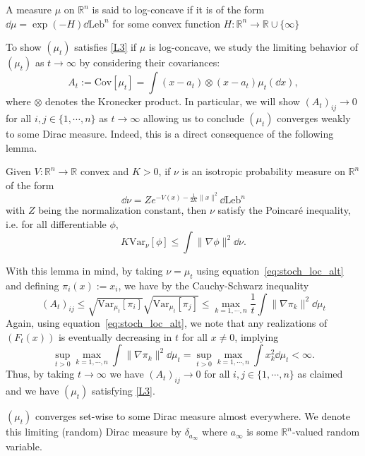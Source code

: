 \begin{definition}
  A measure \(\mu\) on \(\mathbb{R}^n\) is said to log-concave if it is of the form 
  \(\dd \mu = \exp(-H)\dd\text{Leb}^n\) for some convex function \(H : \mathbb{R}^n \to \mathbb{R} \cup \{\infty\}\)
\end{definition}

To show \((\mu_t)\) satisfies \ref{L3} if \(\mu\) is log-concave, we study the limiting behavior of 
\((\mu_t)\) as \(t \to \infty\) by considering their covariances:
\begin{equation}
  A_t := \text{Cov}[\mu_t] = \int (x - a_t) \otimes (x - a_t) \mu_t(\dd x),
\end{equation}
where \(\otimes\) denotes the Kronecker product. In particular, we will show \((A_t)_{ij} \to 0\) for all
 \(i, j \in \{1, \cdots, n\}\) as \(t \to \infty\) allowing us to conclude \((\mu_t)\) converges weakly 
 to some Dirac measure. Indeed, this is a direct consequence of the following lemma.

\begin{lemma}\label{lem:brascamp-lieb}
  Given \(V : \mathbb{R}^n \to \mathbb{R}\) convex and \(K > 0\), if \(\nu\) is an isotropic probability 
  measure on \(\mathbb{R}^n\) of the form 
  \[\dd \nu = Ze^{-V(x) - \frac{1}{2K}\|x\|^2}\dd \text{Leb}^n\]
  with \(Z\) being the normalization constant, then \(\nu\) satisfy the Poincaré inequality, i.e. 
  for all differentiable \(\phi\),
  \[K\text{Var}_\nu[\phi] \le \int \|\nabla\phi\|^2 \dd\nu.\]
\end{lemma}

With this lemma in mind, by taking \(\nu = \mu_t\) using 
equation~\eqref{eq:stoch_loc_alt} and defining
\(\pi_i(x) := x_i\), we have by the Cauchy-Schwarz inequality
\[(A_t)_{ij} \le \sqrt{\text{Var}_{\mu_t}[\pi_i]}\sqrt{\text{Var}_{\mu_t}[\pi_j]} 
  \le \max_{k = 1, \cdots, n} \frac{1}{t}\int \|\nabla \pi_k\|^2 \dd \mu_t\]
Again, using equation~\eqref{eq:stoch_loc_alt}, we note that any realizations of \((F_t(x))\) is eventually 
decreasing in \(t\) for all \(x \neq 0\), implying 
\[\sup_{t > 0} \max_{k = 1, \cdots, n} \int \|\nabla \pi_k\|^2 \dd \mu_t = 
\sup_{t > 0} \max_{k = 1, \cdots, n} \int x_k^2 \dd \mu_t < \infty.\] 
Thus, by taking \(t \to \infty\) we have \((A_t)_{ij} \to 0\) for all \(i, j \in \{1, \cdots, n\}\) as claimed 
and we have \((\mu_t)\) satisfying \ref{L3}.

\begin{corollary}
  \((\mu_t)\) converges set-wise to some Dirac measure almost everywhere. We denote this 
  limiting (random) Dirac measure by \(\delta_{a_\infty}\) where \(a_\infty\) is some 
  \(\mathbb{R}^n\)-valued random variable.
\end{corollary}

